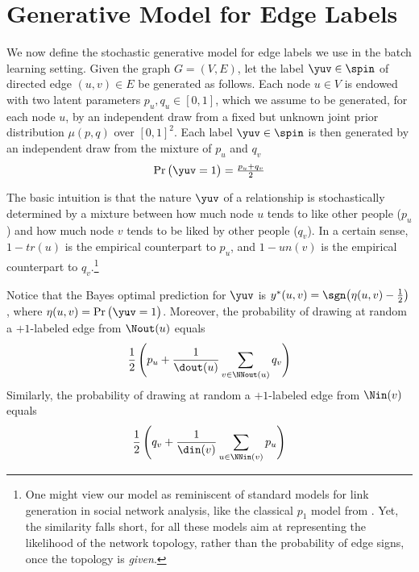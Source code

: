 \section{Generative Model for Edge Labels}\label{s:gen}

We now define the stochastic generative model for edge labels we use in the batch learning setting.
Given the graph $G = (V,E)$, let the label $\yuv \in \spin$ of directed edge $(u,v) \in E$ be
generated as follows. Each node $u \in V$ is endowed with two latent parameters $p_u, q_u \in
[0,1]$, which we assume to be generated, for each node $u$, by an independent draw from a fixed but
unknown joint prior distribution $\mu(p,q)$ over $[0,1]^2$. Each label $\yuv \in \spin$ is then
generated by an independent draw from the mixture of $p_u$ and $q_v$
$$\Pr\big( \yuv = 1 \big) = \tfrac{p_u + q_v}{2}$$

The basic intuition is that the nature $\yuv$ of a relationship \euv{} is stochastically
determined by a mixture between how much node $u$ tends to like other people ($p_u$) and how much
node $v$ tends to be liked by other people ($q_v$). In a certain sense, $1-tr(u)$ is the empirical
counterpart to $p_u$, and $1-un(v)$ is the empirical counterpart to $q_v$.\footnote{One might view
our model as reminiscent of standard models for link generation in social network analysis, like the
classical $p_1$ model from \cite{hl81}. Yet, the similarity falls short, for all these models aim at
representing the likelihood of the network topology, rather than the probability of edge signs, once
the topology is \emph{given}.} 

Notice that the Bayes optimal prediction for $\yuv$ is $y^*(u,v) = \sgn\big(\eta(u,v) -
\tfrac{1}{2}\big)$, where $\eta(u,v) = \Pr\big( \yuv = 1 \big)$. Moreover, the probability of
drawing at random a $+1$-labeled edge from $\Nout(u)$ equals
\begin{equation}\label{e:pout}
	\frac{1}{2}\,\Biggl(p_u + \frac{1}{\dout(u)} \sum_{v\in \NNout(u)} q_v \Biggl)
\end{equation}
Similarly, the probability of drawing at random a $+1$-labeled edge from $\Nin(v)$ equals
\begin{equation}\label{e:pin}
	\frac{1}{2}\,\Biggl(q_v + \frac{1}{\din(v)} \sum_{u\in \NNin(v)} p_u \Biggl)
\end{equation}
